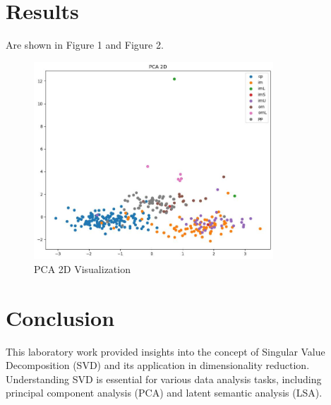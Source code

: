 \documentclass{article}
\begin{document}
\section{Results}
Are shown in Figure 1 and Figure 2.
\begin{figure}[h]
    \centering
    \includegraphics[width=0.8\textwidth]{pca_2d.jpg}
    \caption{PCA 2D Visualization}
\end{figure}





\section{Conclusion}
This laboratory work provided insights into the concept of Singular Value Decomposition (SVD) and its application in dimensionality reduction. Understanding SVD is essential for various data analysis tasks, including principal component analysis (PCA) and latent semantic analysis (LSA).
\end{document}
